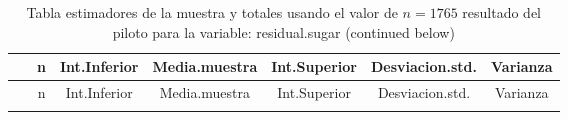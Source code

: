 \documentclass[
]{article}
\begin{document}
\begin{longtable}[]{@{}ccccccc@{}}
\caption{Tabla estimadores de la muestra y totales usando el valor de
\(n = 1765\) resultado del piloto para la variable: residual.sugar
(continued below)}\tabularnewline
\toprule
\begin{minipage}[b]{0.20\columnwidth}\centering
~\strut
\end{minipage} & \begin{minipage}[b]{0.05\columnwidth}\centering
n\strut
\end{minipage} & \begin{minipage}[b]{0.11\columnwidth}\centering
Int.Inferior\strut
\end{minipage} & \begin{minipage}[b]{0.12\columnwidth}\centering
Media.muestra\strut
\end{minipage} & \begin{minipage}[b]{0.11\columnwidth}\centering
Int.Superior\strut
\end{minipage} & \begin{minipage}[b]{0.13\columnwidth}\centering
Desviacion.std.\strut
\end{minipage} & \begin{minipage}[b]{0.09\columnwidth}\centering
Varianza\strut
\end{minipage}\tabularnewline
\midrule
\endfirsthead
\toprule
\begin{minipage}[b]{0.20\columnwidth}\centering
~\strut
\end{minipage} & \begin{minipage}[b]{0.05\columnwidth}\centering
n\strut
\end{minipage} & \begin{minipage}[b]{0.11\columnwidth}\centering
Int.Inferior\strut
\end{minipage} & \begin{minipage}[b]{0.12\columnwidth}\centering
Media.muestra\strut
\end{minipage} & \begin{minipage}[b]{0.11\columnwidth}\centering
Int.Superior\strut
\end{minipage} & \begin{minipage}[b]{0.13\columnwidth}\centering
Desviacion.std.\strut
\end{minipage} & \begin{minipage}[b]{0.09\columnwidth}\centering
Varianza\strut
\end{minipage}\tabularnewline
\midrule
\endhead
\begin{minipage}[t]{0.20\columnwidth}\centering

\end{minipage}
\end{longtable}
\end{document}
